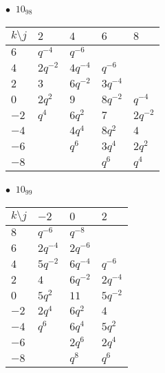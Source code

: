 %
\begin{minipage}{\linewidth}
$\bullet\ $ $10_{98}$ \vspace{0.5em} \\
\begin{tabular}{l|llll}
$k \setminus j$ & $2$ & $4$ & $6$ & $8$ \\
\hline
$6$ & $q^{-4}$ & $q^{-6}$ &  &  \\
$4$ & $2q^{-2}$ & $4q^{-4}$ & $q^{-6}$ &  \\
$2$ & $3$ & $6q^{-2}$ & $3q^{-4}$ &  \\
$0$ & $2q^{2}$ & $9$ & $8q^{-2}$ & $q^{-4}$ \\
$-2$ & $q^{4}$ & $6q^{2}$ & $7$ & $2q^{-2}$ \\
$-4$ &  & $4q^{4}$ & $8q^{2}$ & $4$ \\
$-6$ &  & $q^{6}$ & $3q^{4}$ & $2q^{2}$ \\
$-8$ &  &  & $q^{6}$ & $q^{4}$ \\
\end{tabular}
\vspace{2em}
\end{minipage}
%
\begin{minipage}{\linewidth}
$\bullet\ $ $10_{99}$ \vspace{0.5em} \\
\begin{tabular}{l|lll}
$k \setminus j$ & $-2$ & $0$ & $2$ \\
\hline
$8$ & $q^{-6}$ & $q^{-8}$ &  \\
$6$ & $2q^{-4}$ & $2q^{-6}$ &  \\
$4$ & $5q^{-2}$ & $6q^{-4}$ & $q^{-6}$ \\
$2$ & $4$ & $6q^{-2}$ & $2q^{-4}$ \\
$0$ & $5q^{2}$ & $11$ & $5q^{-2}$ \\
$-2$ & $2q^{4}$ & $6q^{2}$ & $4$ \\
$-4$ & $q^{6}$ & $6q^{4}$ & $5q^{2}$ \\
$-6$ &  & $2q^{6}$ & $2q^{4}$ \\
$-8$ &  & $q^{8}$ & $q^{6}$ \\
\end{tabular}
\vspace{2em}
\end{minipage}
%
